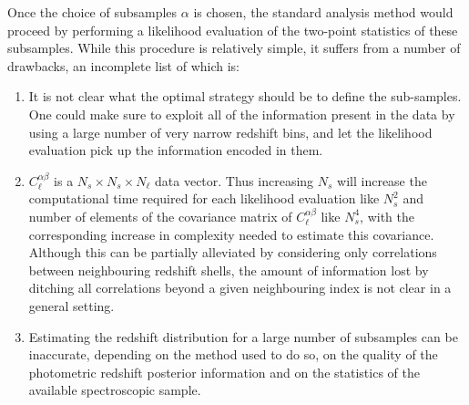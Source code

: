 \documentclass[twocolumn,amsfont,amssymb,amsmath, showpacs,balancelastpage, nofootinbib]{revtex4-1}
\begin{document}
    Once the choice of subsamples $\alpha$ is chosen, the standard analysis method would proceed by performing a likelihood evaluation of the two-point statistics of these subsamples. While this procedure is relatively simple, it suffers from a number of drawbacks, an incomplete list of which is:
    \begin{enumerate}
      \item It is not clear what the optimal strategy should be to define the sub-samples. One could make sure to exploit all of the information present in the data by using a large number of very narrow redshift bins, and let the likelihood evaluation pick up the information encoded in them.
      \item $C^{\alpha\beta}_\ell$ is a $N_s\times N_s\times N_\ell$ data vector. Thus increasing $N_s$ will increase the computational time required for each likelihood evaluation like $N_s^2$ and number of elements of the covariance matrix of $C^{\alpha\beta}_\ell$ like $N_s^4$, with the corresponding increase in complexity needed to estimate this covariance. Although this can be partially alleviated by considering only correlations between neighbouring redshift shells, the amount of information lost by ditching all correlations beyond a given neighbouring index is not clear in a general setting.
      \item Estimating the redshift distribution for a large number of subsamples can be inaccurate, depending on the method used to do so, on the quality of the photometric redshift posterior information and on the statistics of the available spectroscopic sample.
    \end{enumerate}
  
\end{document}
